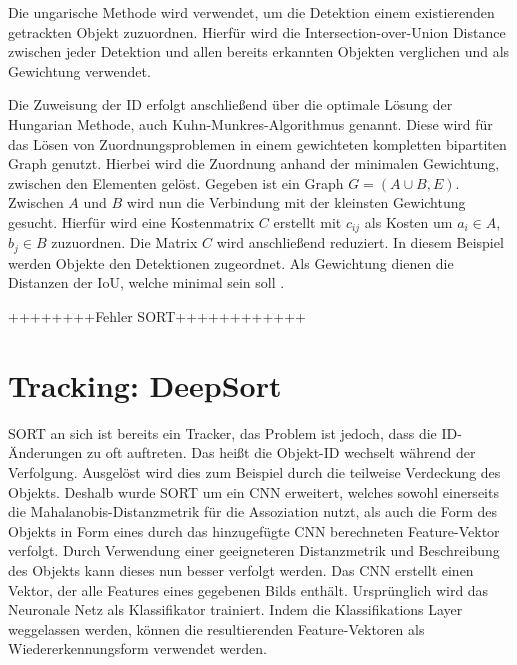 \documentclass[conference]{IEEEtran}
\begin{document}
	Die ungarische Methode wird verwendet, um die Detektion einem existierenden getrackten Objekt zuzuordnen. Hierfür wird die Intersection-over-Union Distance zwischen jeder Detektion und allen bereits erkannten Objekten verglichen und als Gewichtung verwendet.
	
	Die Zuweisung der ID erfolgt anschließend über die optimale Lösung der Hungarian Methode, auch Kuhn-Munkres-Algorithmus genannt. Diese wird für das Lösen von Zuordnungsproblemen in einem gewichteten kompletten bipartiten Graph genutzt. Hierbei wird die Zuordnung anhand der minimalen Gewichtung, zwischen den Elementen gelöst. Gegeben ist ein Graph $G = (A \cup B, E) $. Zwischen $A$ und $B$ wird nun die Verbindung mit der kleinsten Gewichtung gesucht. Hierfür wird eine Kostenmatrix $C$ erstellt mit $c_{ij}$ als Kosten um $a_i \in A$, $b_j \in B$ zuzuordnen. Die Matrix $C$ wird anschließend reduziert. In diesem Beispiel werden Objekte den Detektionen zugeordnet. Als Gewichtung dienen die Distanzen der IoU, welche minimal sein soll \cite{hungarian}.
	 
	 ++++++++Fehler SORT++++++++++++
	 
	\section{Tracking: DeepSort}
	
	SORT an sich ist bereits ein Tracker, das Problem ist jedoch, dass die ID-Änderungen zu oft auftreten. Das heißt die Objekt-ID wechselt während der Verfolgung. Ausgelöst wird dies zum Beispiel durch die teilweise Verdeckung des Objekts. Deshalb wurde SORT um ein CNN erweitert, welches sowohl einerseits die Mahalanobis-Distanzmetrik für die Assoziation nutzt, als auch die Form des Objekts in Form eines durch das hinzugefügte CNN berechneten Feature-Vektor verfolgt. Durch Verwendung einer geeigneteren Distanzmetrik und Beschreibung des Objekts kann dieses nun besser verfolgt werden.
	Das CNN erstellt einen Vektor, der alle Features eines gegebenen Bilds enthält. Ursprünglich wird das Neuronale Netz als Klassifikator trainiert. Indem die Klassifikations Layer weggelassen werden, können die resultierenden Feature-Vektoren als Wiedererkennungsform verwendet werden.
	
\end{document}
